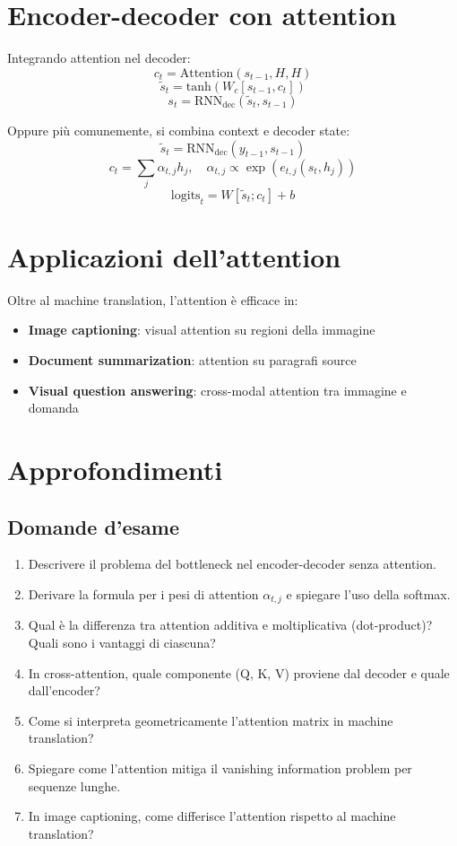 \section{Encoder-decoder con attention}

Integrando attention nel decoder:
\[
c_t = \text{Attention}(s_{t-1}, H, H)
\]
\[
\tilde{s}_t = \text{tanh}(W_c [s_{t-1}, c_t])
\]
\[
s_t = \text{RNN}_{\text{dec}}(\tilde{s}_t, s_{t-1})
\]

Oppure più comunemente, si combina context e decoder state:
\[
\tilde{s}_t = \text{RNN}_{\text{dec}}(y_{t-1}, s_{t-1})
\]
\[
c_t = \sum_j \alpha_{t,j} h_j, \quad \alpha_{t,j} \propto \exp(e_{t,j}(s_t, h_j))
\]
\[
\text{logits}_t = W[\tilde{s}_t; c_t] + b
\]

\section{Applicazioni dell'attention}

Oltre al machine translation, l'attention è efficace in:

\begin{itemize}
\item \textbf{Image captioning}: visual attention su regioni della immagine
\item \textbf{Document summarization}: attention su paragrafi source
\item \textbf{Visual question answering}: cross-modal attention tra immagine e domanda
\end{itemize}

\section{Approfondimenti}

\subsection{Domande d'esame}

\begin{enumerate}
\item Descrivere il problema del bottleneck nel encoder-decoder senza attention.
\item Derivare la formula per i pesi di attention $\alpha_{t,j}$ e spiegare l'uso della softmax.
\item Qual è la differenza tra attention additiva e moltiplicativa (dot-product)? Quali sono i vantaggi di ciascuna?
\item In cross-attention, quale componente (Q, K, V) proviene dal decoder e quale dall'encoder?
\item Come si interpreta geometricamente l'attention matrix in machine translation?
\item Spiegare come l'attention mitiga il vanishing information problem per sequenze lunghe.
\item In image captioning, come differisce l'attention rispetto al machine translation?
\end{enumerate}

